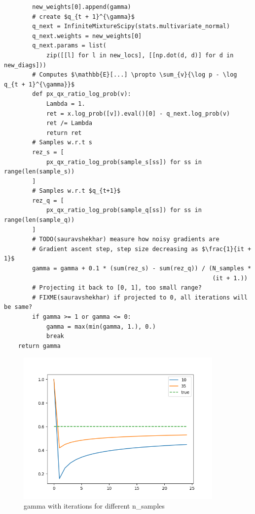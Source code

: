 \documentclass[letterpaper]{article}
\begin{document}
\begin{verbatim}
        new_weights[0].append(gamma)
        # create $q_{t + 1}^{\gamma}$
        q_next = InfiniteMixtureScipy(stats.multivariate_normal)
        q_next.weights = new_weights[0]
        q_next.params = list(
            zip([[l] for l in new_locs], [[np.dot(d, d)] for d in new_diags]))
        # Computes $\mathbb{E}[...] \propto \sum_{v}{\log p - \log q_{t + 1}^{\gamma}}$
        def px_qx_ratio_log_prob(v):
            Lambda = 1.
            ret = x.log_prob([v]).eval()[0] - q_next.log_prob(v)
            ret /= Lambda
            return ret
        # Samples w.r.t s
        rez_s = [
            px_qx_ratio_log_prob(sample_s[ss]) for ss in range(len(sample_s))
        ]
        # Samples w.r.t $q_{t+1}$
        rez_q = [
            px_qx_ratio_log_prob(sample_q[ss]) for ss in range(len(sample_q))
        ]
        # TODO(sauravshekhar) measure how noisy gradients are
        # Gradient ascent step, step size decreasing as $\frac{1}{it + 1}$
        gamma = gamma + 0.1 * (sum(rez_s) - sum(rez_q)) / (N_samples *
                                                           (it + 1.))
        # Projecting it back to [0, 1], too small range?
        # FIXME(sauravshekhar) if projected to 0, all iterations will be same?
        if gamma >= 1 or gamma <= 0:
            gamma = max(min(gamma, 1.), 0.)
            break
    return gamma
  \end{verbatim}
  \begin{figure}[h] \label{fig:gamma}
  \centering
  \includegraphics[width=0.9\textwidth]{plots/gamma.png}
  \caption{gamma with iterations for different n\_samples}
  \end{figure}
\end{document}
